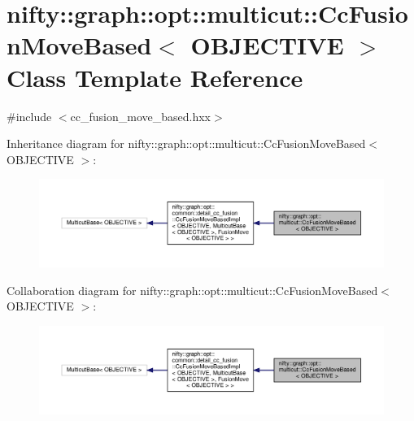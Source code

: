 \hypertarget{classnifty_1_1graph_1_1opt_1_1multicut_1_1CcFusionMoveBased}{}\section{nifty\+:\+:graph\+:\+:opt\+:\+:multicut\+:\+:Cc\+Fusion\+Move\+Based$<$ O\+B\+J\+E\+C\+T\+I\+VE $>$ Class Template Reference}
\label{classnifty_1_1graph_1_1opt_1_1multicut_1_1CcFusionMoveBased}


{\ttfamily \#include $<$cc\+\_\+fusion\+\_\+move\+\_\+based.\+hxx$>$}



Inheritance diagram for nifty\+:\+:graph\+:\+:opt\+:\+:multicut\+:\+:Cc\+Fusion\+Move\+Based$<$ O\+B\+J\+E\+C\+T\+I\+VE $>$\+:
\nopagebreak
\begin{figure}[H]
\begin{center}
\leavevmode
\includegraphics[width=350pt]{classnifty_1_1graph_1_1opt_1_1multicut_1_1CcFusionMoveBased__inherit__graph}
\end{center}
\end{figure}


Collaboration diagram for nifty\+:\+:graph\+:\+:opt\+:\+:multicut\+:\+:Cc\+Fusion\+Move\+Based$<$ O\+B\+J\+E\+C\+T\+I\+VE $>$\+:
\nopagebreak
\begin{figure}[H]
\begin{center}
\leavevmode
\includegraphics[width=350pt]{classnifty_1_1graph_1_1opt_1_1multicut_1_1CcFusionMoveBased__coll__graph}
\end{center}
\end{figure}
